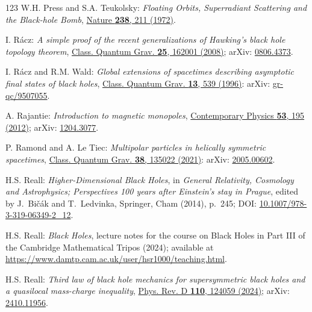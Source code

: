 \begin{thebibliography}{123}
W.H. Press and S.A. Teukolsky:
{\em Floating Orbits, Superradiant Scattering and the Black-hole Bomb},
\href{https://doi.org/10.1038/238211a0}{Nature {\bf 238}, 211 (1972)}.

I. R\'acz:
{\em A simple proof of the recent generalizations of Hawking's black hole topology theorem},
\href{https://doi.org/10.1088/0264-9381/25/16/162001}{Class. Quantum Grav. {\bf 25}, 162001 (2008)};
arXiv: \href{https://arxiv.org/abs/0806.4373}{0806.4373}.

I. R\'acz and R.M. Wald:
{\em Global extensions of spacetimes describing asymptotic final states of black holes},
\href{https://doi.org/10.1088/0264-9381/13/3/017}{Class. Quantum Grav. {\bf 13}, 539 (1996)}:
arXiv: \href{https://arxiv.org/abs/gr-qc/9507055}{gr-qc/9507055}.

A. Rajantie:
{\em Introduction to magnetic monopoles},
\href{https://doi.org/10.1080/00107514.2012.685693}{Contemporary Physics {\bf 53}, 195 (2012)};
arXiv: \href{https://arxiv.org/abs/1204.3077}{1204.3077}.

P. Ramond and A. Le Tiec:
{\em Multipolar particles in helically symmetric spacetimes},
\href{https://doi.org/10.1088/1361-6382/abebef}{Class. Quantum Grav. {\bf 38}, 135022 (2021)}:
arXiv: \href{https://arxiv.org/abs/2005.00602}{2005.00602}.

H.S. Reall:
{\em Higher-Dimensional Black Holes},
in {\em  General Relativity, Cosmology and Astrophysics; Perspectives 100 years after Einstein's stay in Prague}, edited by J.~Bičák and T.~Ledvinka,
Springer, Cham (2014), p.~245;
DOI: \href{https://doi.org/10.1007/978-3-319-06349-2_12}{10.1007/978-3-319-06349-2\_12}.

H.S. Reall: {\em Black Holes}, lecture notes for the course on Black Holes in
Part III of the Cambridge Mathematical Tripos (2024); available at
\url{https://www.damtp.cam.ac.uk/user/hsr1000/teaching.html}.

H.S. Reall:
{\em Third law of black hole mechanics for supersymmetric black holes and a quasilocal mass-charge inequality},
\href{https://doi.org/10.1103/PhysRevD.110.124059}{Phys. Rev. D {\bf 110}, 124059 (2024)};
arXiv: \href{https://arxiv.org/abs/2410.11956}{2410.11956}.


\end{thebibliography}
